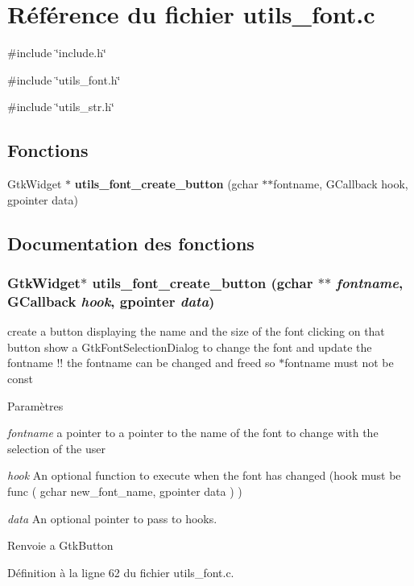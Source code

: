 \section{Référence du fichier utils\_\-font.c}
\label{utils__font_8c}
{\ttfamily \#include \char`\"{}include.h\char`\"{}}\par
{\ttfamily \#include \char`\"{}utils\_\-font.h\char`\"{}}\par
{\ttfamily \#include \char`\"{}utils\_\-str.h\char`\"{}}\par
\subsection*{Fonctions}
\begin{DoxyCompactItemize}
\item 
GtkWidget $\ast$ {\bf utils\_\-font\_\-create\_\-button} (gchar $\ast$$\ast$fontname, GCallback hook, gpointer data)
\end{DoxyCompactItemize}


\subsection{Documentation des fonctions}
\subsubsection[{utils\_\-font\_\-create\_\-button}]{\setlength{\rightskip}{0pt plus 5cm}GtkWidget$\ast$ utils\_\-font\_\-create\_\-button (gchar $\ast$$\ast$ {\em fontname}, \/  GCallback {\em hook}, \/  gpointer {\em data})}\label{utils__font_8c_acb32a0d74b002d3e38a74fff48c7c3e5}
create a button displaying the name and the size of the font clicking on that button show a GtkFontSelectionDialog to change the font and update the fontname !! the fontname can be changed and freed so $\ast$fontname must not be const


\begin{DoxyParams}{Paramètres}
\item[{\em fontname}]a pointer to a pointer to the name of the font to change with the selection of the user \item[{\em hook}]An optional function to execute when the font has changed (hook must be func ( gchar new\_\-font\_\-name, gpointer data ) ) \item[{\em data}]An optional pointer to pass to hooks.\end{DoxyParams}
\begin{DoxyReturn}{Renvoie}
a GtkButton 
\end{DoxyReturn}


Définition à la ligne 62 du fichier utils\_\-font.c.

